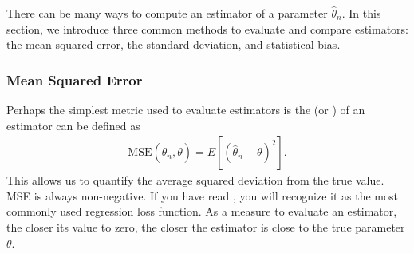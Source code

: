 \documentclass[letterpaper,11pt,english]{sphinxmanual}
\begin{document}
\begin{sphinxVerbatim}[commandchars=\\\{\}]
   
 
  
\end{sphinxVerbatim}

There can be many ways to compute an estimator of a parameter
\(\hat{\theta}_n\). In this section, we introduce three common
methods to evaluate and compare estimators: the mean squared error, the
standard deviation, and statistical bias.


\subsubsection{Mean Squared Error}
\label{\detokenize{chapter_appendix_math/statistics:mean-squared-error}}
Perhaps the simplest metric used to evaluate estimators is the  (or ) of an estimator can be
defined as
\begin{equation}\label{equation:chapter_appendix_math/statistics:eq_mse_est}
\begin{split}\mathrm{MSE} (\hat{\theta}_n, \theta) = E[(\hat{\theta}_n - \theta)^2].\end{split}
\end{equation}
This allows us to quantify the average squared deviation from the true
value. MSE is always non-negative. If you have read
, you will recognize it as the most
commonly used regression loss function. As a measure to evaluate an
estimator, the closer its value to zero, the closer the estimator is
close to the true parameter \(\theta\).
\end{document}
